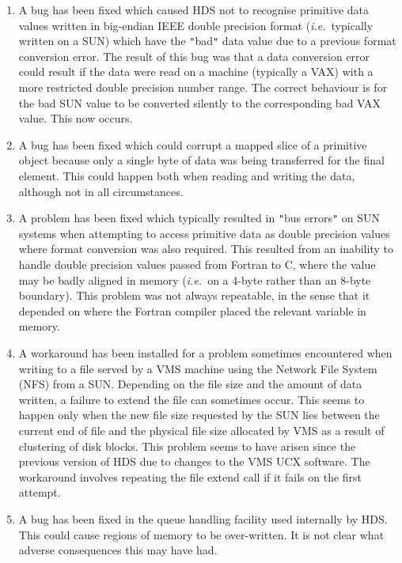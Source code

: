 \documentclass[11pt]{article}
\newcommand{\qt}[1]{``#1''}
\newcommand{\st}[1]{{\em{#1}}}
\renewcommand{\qt}[1]{{\tt{"}}#1{\tt{"}}}
\begin{document}
\begin{enumerate}
\item
A bug has been fixed which caused HDS not to recognise primitive data
values written in big-endian IEEE double precision format
(\st{i.e.}\ typically written on a SUN) which have the \qt{bad} data value
due to
a previous format conversion error. The result of this bug was that a
data conversion error could result if the data were read on a machine
(typically a VAX) with a more restricted double precision number
range. The correct behaviour is for the bad SUN value to be converted
silently to the corresponding bad VAX value. This now occurs.

\item
A bug has been fixed which could corrupt a mapped slice of a primitive
object because only a single byte of data was being transferred for
the final element.  This could happen both when reading and writing
the data, although not in all circumstances.

\item
A problem has been fixed which typically resulted in \qt{bus errors}
on SUN systems when attempting to access primitive data as double
precision values where format conversion was also required. This
resulted from an inability to handle double precision values passed
from Fortran to C, where the value may be badly aligned in memory
(\st{i.e.}\ on a 4-byte rather than an 8-byte boundary).  This problem
was not always repeatable, in the sense that it depended on where the
Fortran compiler placed the relevant variable in memory.

\item
A workaround has been installed for a problem sometimes encountered
when writing to a file served by a VMS machine using the Network File
System (NFS) from a SUN. Depending on the file size and the amount of
data written, a failure to extend the file can sometimes occur. This
seems to happen only when the new file size requested by the SUN lies
between the current end of file and the physical file size allocated
by VMS as a result of clustering of disk blocks. This problem seems to
have arisen since the previous version of HDS due to changes to the
VMS UCX software. The workaround involves repeating the file extend
call if it fails on the first attempt.

\item
A bug has been fixed in the queue handling facility used internally by
HDS. This could cause regions of memory to be over-written. It is not
clear what adverse consequences this may have had.


\end{enumerate}
\end{document}
